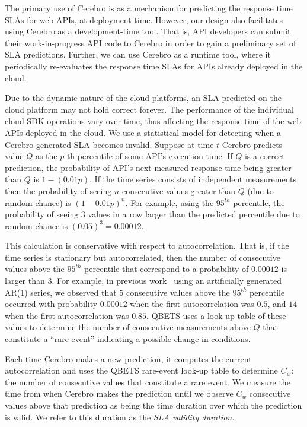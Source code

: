 The primary use of Cerebro is as a mechanism for predicting the response time SLAs for web APIs,
at deployment-time. However, our design also facilitates using
Cerebro as a development-time tool. That is, API developers can submit their work-in-progress
API code to Cerebro in order to gain a preliminary set of SLA predictions. Further, we can use
Cerebro as a runtime tool, where it periodically re-evaluates the response time SLAs for 
APIs already deployed in the cloud.

Due to the dynamic nature of the cloud platforms, an SLA predicted on the cloud platform may not
hold correct forever. The performance of the individual cloud SDK operations vary over time, thus
affecting the response time of the web APIs deployed in the cloud. We use a
statistical model for detecting when a Cerebro-generated SLA becomes invalid. 
Suppose at time $t$ Cerebro predicts value $Q$ as the $p$-th percentile of
some API's execution time.  If $Q$ is a correct prediction,
the probability of API's next measured response time being greater than 
$Q$ is $1-(0.01p)$.  If the time series consists of independent
measurements then the probability of seeing $n$ consecutive values greater
than $Q$ (due to random chance) is $(1-0.01p)^n$. 
For example, using the $95^{th}$ percentile, the probability of seeing $3$
values in a row larger than the predicted percentile due to random chance
is $(0.05)^3 = 0.00012$.

This calculation is conservative with respect to autocorrelation. That is, if
the time series is stationary but autocorrelated, then the number of consecutive 
values above the $95^{th}$ percentile that correspond to a probability of
$0.00012$ is larger than $3$.  For example, in previous
work~\cite{Nurmi:2007:QQB:1791551.1791556}
using an artificially generated AR(1) series, 
we observed that $5$ consecutive values above the $95^{th}$ percentile
occurred with probability $0.00012$ when the first autocorrelation was $0.5$,
and $14$ when the first autocorrelation was $0.85$. QBETS uses a look-up
table of these values to determine the number of consecutive measurements above
$Q$ that constitute a ``rare event'' indicating a possible change in conditions.

Each time Cerebro makes a new prediction, it computes the current
autocorrelation and uses the QBETS rare-event look-up table to determine $C_{w}$:
the number of consecutive values that constitute a rare event.
We measure the time from when
Cerebro makes the prediction until we observe $C_{w}$ 
consecutive values above that prediction 
as being the time duration over which
the prediction is valid. We refer to this duration as the \textit{SLA validity duration}.  

